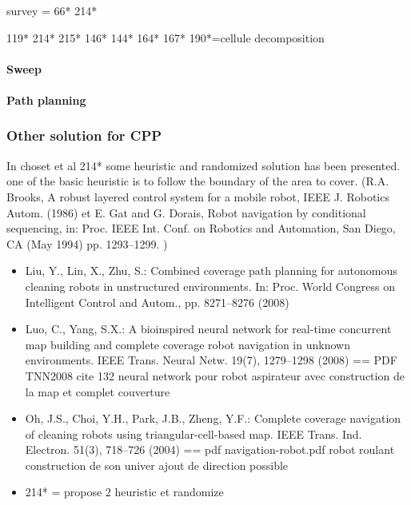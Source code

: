  survey = 66* 214*
 
 
119* 214* 215* 146*  144* 164* 167* 190*=cellule decomposition \\ 
 
 \paragraph{Sweep} 
 
 \paragraph{Path planning}
 

\subsubsection{Other solution for CPP}



In choset et al 214*  some heuristic and randomized solution has been presented.    
one of the basic heuristic is to follow the boundary of the area to cover. (R.A. Brooks, A robust layered control system for a mobile robot, IEEE J. Robotics Autom. (1986)   et
  E. Gat and G. Dorais, Robot navigation by conditional sequencing, in: Proc. IEEE Int. Conf. on
Robotics and Automation, San Diego, CA (May 1994) pp. 1293–1299. )

	\begin{itemize}
	\item Liu, Y., Lin, X., Zhu, S.: Combined coverage path planning for autonomous cleaning robots in unstructured environments. In: Proc. World Congress on Intelligent Control and Autom., pp. 8271–8276 (2008) 

	\item Luo, C., Yang, S.X.: A bioinspired neural network for
real-time concurrent map building and complete coverage robot navigation in unknown environments. IEEE
Trans. Neural Netw. 19(7), 1279–1298 (2008) == PDF TNN2008  cite 132  neural network pour  robot aspirateur  avec construction de la map  et complet couverture  
	
	\item Oh, J.S., Choi, Y.H., Park, J.B., Zheng, Y.F.: Complete coverage navigation of cleaning robots using
triangular-cell-based map. IEEE Trans. Ind. Electron. 51(3), 718–726 (2004) == pdf navigation-robot.pdf   robot roulant construction de son univer ajout de direction possible

	\item 214* = propose 2 heuristic  et randomize 
	\end{itemize}
	
